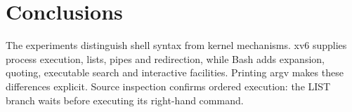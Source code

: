 \chapter{Conclusions}

The experiments distinguish shell syntax from kernel mechanisms. xv6 supplies process execution, lists, pipes and redirection, while Bash adds expansion, quoting, executable search and interactive facilities. Printing argv makes these differences explicit. Source inspection confirms ordered execution: the LIST branch waits before executing its right-hand command.
